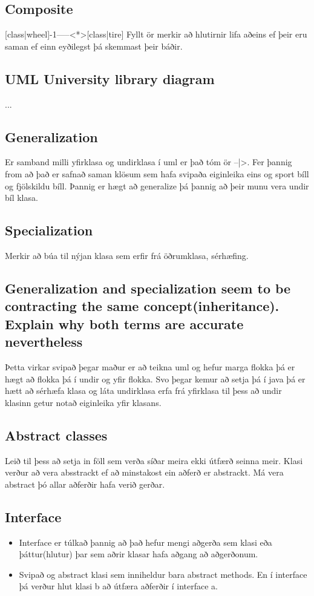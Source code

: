 \documentclass[openany]{article}
\begin{document}
\subsection{Composite}
[class|wheel]-1-----<*>[class|tire] Fyllt ör merkir að hlutirnir lifa aðeins ef þeir eru saman ef einn eyðilegst þá skemmast þeir báðir.
\subsection{UML University library diagram}
...
\subsection{Generalization}
Er samband milli yfirklasa og undirklasa í uml er það tóm ör --|>. Fer þannig from að það er safnað saman klösum sem hafa svipaða eiginleika eins og sport bíll og fjölskildu bíll. Þannig er hægt að generalize þá þannig að þeir munu vera undir bíl klasa.
\subsection{Specialization}
Merkir að búa til nýjan klasa sem erfir frá öðrumklasa, sérhæfing.
\subsection{Generalization and specialization seem to be contracting the same concept(inheritance). Explain why both terms are accurate nevertheless}
Þetta virkar svipað þegar maður er að teikna uml og hefur marga flokka þá er hægt að flokka þá í undir og yfir flokka. Svo þegar kemur að setja þá í java þá er hætt að sérhæfa klasa og láta undirklasa erfa frá yfirklasa til þess að undir klasinn getur notað eiginleika yfir klasans.
\subsection{Abstract classes}
Leið til þess að setja in föll sem verða síðar meira ekki útfærð seinna meir. Klasi verður að vera absstrackt ef að minstakost ein aðferð er abstrackt. Má vera abstract þó allar aðferðir hafa verið gerðar.
\subsection{Interface}
\begin{itemize}
	\item Interface er túlkað þannig að það hefur mengi aðgerða sem klasi eða þáttur(hlutur) þar sem aðrir klasar hafa aðgang að aðgerðonum.
	\item Svipað og abstract klasi sem inniheldur bara abstract methods. En í interface þá verður hlut klasi b að útfæra aðferðir í interface a.
\end{itemize}
\end{document}
